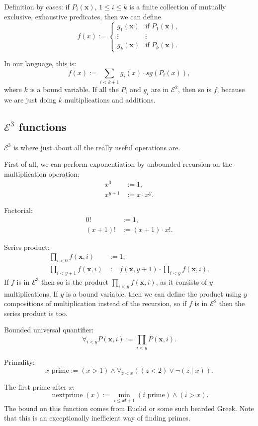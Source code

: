 \documentclass[a4paper]{article}
\newcommand{\grz}[1]{$\mathcal{E}^{#1}$}	%
\newcommand{\xvec}{\mathbf{x}}	%
\newcommand{\recur}[1]{\begin{equation} \begin{split} #1 \end{split} \end{equation}}	%
\theoremstyle{plain}
\theoremstyle{definition}
\begin{document}
Definition by cases: if  $P_i(\xvec)$, $1 \leq i \leq k$ is a finite collection of mutually exclusive, exhaustive predicates, then we can define
\[ f(x) := \begin{cases}
	g_1(\xvec) & \textrm{if }P_1(\xvec),	\\
	\vdots & \vdots	\\
	g_k(\xvec) & \textrm{if } P_k(\xvec).
\end{cases} \]

In our language, this is:
\begin{equation} f(x) := \sum_{i < k+1} g_i(x) \cdot sg(P_i(x)), \end{equation}
where $k$ is a bound variable. If all the $P_i$ and $g_i$ are in \grz{2}, then so is $f$, because we are just doing $k$ multiplications and additions.

\subsection{\grz{3} functions}
\grz{3} is where just about all the really useful operations are.

First of all, we can perform exponentiation by unbounded recursion on the multiplication operation:
\recur{
	x^0 &:= 1,				\\
	x^{y+1} &:= x \cdot x^y.
}

Factorial:
\recur{
	0! &:= 1,	\\
	(x+1)! &:= (x+1) \cdot x!.
}

Series product:
\recur{
	\prod_{i < 0} f(\xvec,i) &:= 1,	\\
	\prod_{i < y+1} f(\xvec,i) &:= f(\xvec,y+1) \cdot \prod_{i < y} f(\xvec, i).
}
If $f$ is in \grz{3} then so is the product $\prod_{i < y} f(\xvec,i)$, as it consists of $y$ multiplications. If $y$ is a bound variable, then we can define the product using $y$ compositions of multiplication instead of the recursion, so if $f$ is in \grz{2} then the series product is too.

Bounded universal quantifier:
\begin{equation} \forall_{i < y} P(\xvec,i) := \prod_{i < y} P(\xvec,i). \end{equation}

Primality:
\begin{equation} x \textrm{ prime} :=  (x > 1) \wedge \forall_{z < x} \left( (z < 2) \vee \neg (z \mid x) \right). \end{equation}

The first prime after $x$:
\begin{equation} \operatorname{nextprime}(x) := \min_{i \leq x!+1} (i \textrm{ prime}) \wedge (i > x). \end{equation}
The bound on this function comes from Euclid or some such bearded Greek. Note that this is an exceptionally inefficient way of finding primes.
\end{document}
